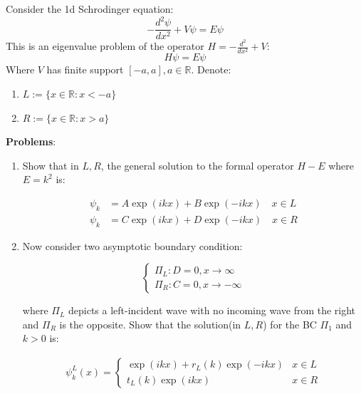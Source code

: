 \begin{mystexercise}\label{1dscat}Consider the 1d Schrodinger equation:
\begin{equation}
-\frac{d^2\psi}{dx^2}+V\psi = E\psi
\end{equation}
This is an eigenvalue problem of the operator $H= -\frac{d^2}{dx^2}+V$:
\begin{equation}
H\psi = E\psi
\end{equation}
Where $V$ has finite support $[ -a, a], a\in \mathbb{R}$. Denote:

\begin{enumerate}
\item $L:=\{x\in \mathbb{R}:x< -a\}$
\item $R:=\{x\in \mathbb{R}:x>a\}$
\end{enumerate}

\textbf{Problems}:

\begin{enumerate}
\item Show that in $L,R$, the general solution to the formal operator $H -E$ where $E=k^2$ is:

\begin{equation}
\begin{aligned}
\psi_k &=A\exp(ikx)+B\exp(-ikx) \quad x\in L  \\
\psi_k &=C\exp(ikx)+D\exp(-ikx) \quad x\in R
\end{aligned}
\end{equation}


\item Now consider two asymptotic boundary condition:

\begin{equation}
\begin{cases}
\Pi_L: D=0, x\to \infty \\
\Pi_R: C=0, x\to -\infty
\end{cases}
\end{equation}


where $\Pi_L$ depicts a left-incident wave with no incoming wave from the right and $\Pi_R$ is the opposite. Show that the solution(in $L,R$) for the BC $\Pi_1$ and $k>0$ is:

\begin{equation}
\begin{aligned}
\psi_k^L(x) = \begin{cases}
\exp(ikx)+ r_L(k)\exp(-ikx) & x\in L \\
t_L(k)\exp(ikx) & x\in R
\end{cases}
\end{aligned}
\end{equation}



\end{enumerate}
\end{mystexercise}
